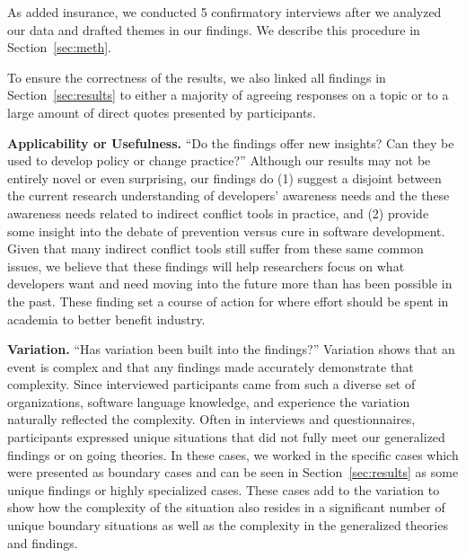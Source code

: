 \documentclass[conference]{IEEEtran}
\begin{document}
As added insurance, we conducted 5 confirmatory interviews after we analyzed our data and drafted themes in our findings. We describe this
procedure in Section~\ref{sec:meth}.

To ensure the correctness of the results, we also linked all findings in Section~\ref{sec:results} to either a majority of agreeing
responses on a topic or to a large amount of direct quotes presented by participants.

{\bfseries Applicability or Usefulness.} ``Do the findings offer new insights? Can they be used to develop policy or change practice?''
Although our results may not be entirely novel or even surprising, our findings do (1) suggest
a disjoint between the current research understanding of developers' awareness needs and the these awareness needs related to indirect conflict tools in practice, and (2) provide some
insight into the debate of prevention versus cure in software development. Given that many indirect conflict tools still suffer from these same common
issues, we believe that these findings will help researchers focus on what developers want and need moving into the future more than has
been possible in the past. These finding set a course of action for where effort should be spent in academia to better benefit industry.


{\bfseries Variation.} ``Has variation been built into the findings?'' Variation shows that an event is complex and that any findings
made accurately demonstrate that complexity. Since interviewed participants came from such a diverse set of organizations,
software language knowledge, and experience the variation naturally reflected the complexity. Often in interviews and questionnaires, participants
expressed unique situations that did not fully meet our generalized findings or on going theories. In these cases, we worked in the specific
cases which were presented as boundary cases and can be seen in Section~\ref{sec:results} as some unique findings or highly
specialized cases. These cases add to the variation
to show how the complexity of the situation also resides in a significant number of unique boundary situations as well as the complexity
in the generalized theories and findings.
\end{document}

